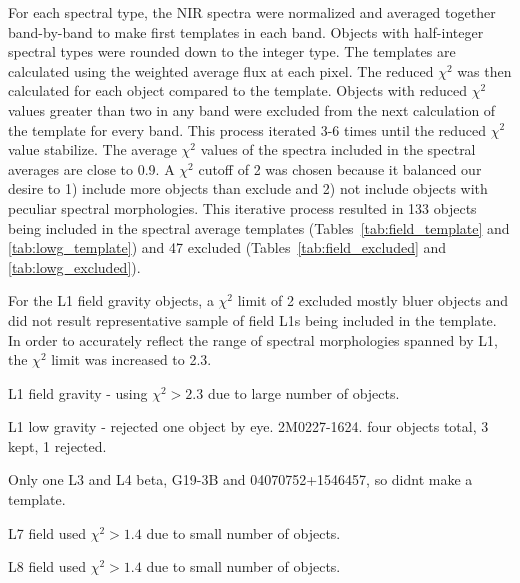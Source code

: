 \documentclass[12pt,preprint]{aastex}
\begin{document}
For each spectral type, the NIR spectra were normalized and averaged together band-by-band to make first templates in each band. Objects with half-integer spectral types were rounded down to the integer type.
The templates are calculated using the weighted average flux at each pixel. 
The reduced $\chi^2$ was then calculated for each object compared to the template.
Objects with reduced $\chi^2$ values greater than two in any band were excluded from the next calculation of the template for every band.
This process iterated 3-6 times until the reduced $\chi^2$ value stabilize. 
The average $\chi^2$ values of the spectra included in the spectral averages are close to 0.9. 
A $\chi^2$ cutoff of 2 was chosen because it balanced our desire to 1) include more objects than exclude and 2) not include objects with peculiar spectral morphologies. 
This iterative process resulted in 133 objects being included in the spectral average templates (Tables~\ref{tab:field_template} and \ref{tab:lowg_template}) and 47 excluded (Tables~\ref{tab:field_excluded} and \ref{tab:lowg_excluded}). 

For the L1 field gravity objects, a $\chi^2$ limit of 2 excluded mostly bluer objects and did not result representative sample of field L1s being included in the template.
In order to accurately reflect the range of spectral morphologies spanned by L1, the $\chi^2$ limit was increased to 2.3.

L1 field gravity - using $\chi^2 > 2.3$ due to large number of objects.

L1 low gravity - rejected one object by eye. 2M0227-1624. four objects total, 3 kept, 1 rejected. 

Only one L3 and L4 beta, G19-3B and 04070752+1546457, so didnt make a template.

L7 field used $\chi^2 > 1.4$ due to small number of objects.

L8 field used $\chi^2 > 1.4$ due to small number of objects.

\end{document}
